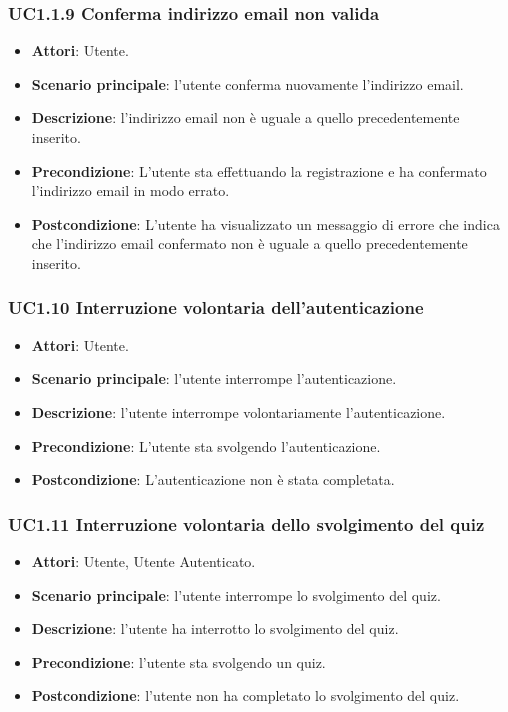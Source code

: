 \subsubsection{UC1.1.9 Conferma indirizzo email non valida}
\begin{itemize}
\item \textbf{Attori}: Utente.
\item \textbf{Scenario principale}: l'utente conferma nuovamente l'indirizzo email.
\item \textbf{Descrizione}: l'indirizzo email non è uguale a quello precedentemente inserito.
\item \textbf{Precondizione}: L'utente sta effettuando la registrazione e ha confermato l'indirizzo email in modo errato.
\item \textbf{Postcondizione}: L'utente ha visualizzato un messaggio di errore che indica che l'indirizzo email confermato non è uguale a quello precedentemente inserito.
\end{itemize}
\subsubsection{UC1.10 Interruzione volontaria dell'autenticazione}
\begin{itemize}
\item \textbf{Attori}: Utente.
\item \textbf{Scenario principale}: l'utente interrompe l'autenticazione.
\item \textbf{Descrizione}: l'utente interrompe volontariamente l'autenticazione.
\item \textbf{Precondizione}: L'utente sta svolgendo l'autenticazione.
\item \textbf{Postcondizione}: L'autenticazione non è stata completata.
\end{itemize}
\subsubsection{UC1.11 Interruzione volontaria dello svolgimento del quiz}
\begin{itemize}
\item \textbf{Attori}: Utente, Utente Autenticato.
\item \textbf{Scenario principale}: l'utente interrompe lo svolgimento del quiz.
\item \textbf{Descrizione}: l'utente ha interrotto lo svolgimento del quiz.
\item \textbf{Precondizione}: l'utente sta svolgendo un quiz.
\item \textbf{Postcondizione}: l'utente non ha completato lo svolgimento del quiz.
\end{itemize}
